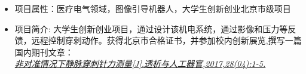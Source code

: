 \begin{itemize}[leftmargin=*]
  {\small
  \begin{itemize}
    \item 项目属性：医疗电气领域，图像引导机器人，大学生创新创业北京市级项目
    \item 项目简介: 大学生创新创业项目，通过设计该机电系统，通过影像和压力等反馈，远程控制穿刺动作。获得北京市合格证书，并参加校内创新展览,撰写一篇国内期刊文章：\\
    \href{https://kns.cnki.net/KCMS/detail/detail.aspx?dbcode=CJFQ&dbname=CJFDLAST2018&filename=TXRG201704001&v=MDk3NTJUM3FUcldNMUZyQ1VSTE9lWitScUZ5bmdXcnZLTVRYWmFiRzRIOWJNcTQ5RlpZUjhlWDFMdXhZUzdEaDE=}{\textit{非对准情况下静脉穿刺针力测量[J].透析与人工器官,2017,28(04):1-5.}} 
  \end{itemize}
  }
\end{itemize}